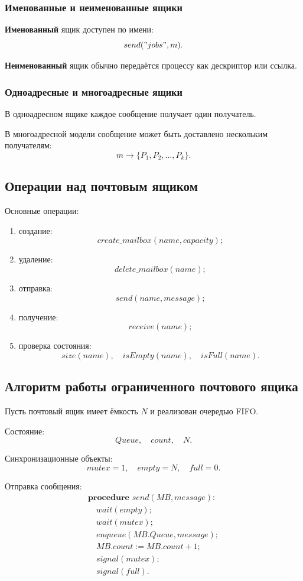 \documentclass[12pt,a4paper]{article}
\begin{document}
\subsubsection{Именованные и неименованные ящики}

\textbf{Именованный} ящик доступен по имени:
\[
send("jobs", m).
\]

\textbf{Неименованный} ящик обычно передаётся процессу как дескриптор или ссылка.

\subsubsection{Одноадресные и многоадресные ящики}

В одноадресном ящике каждое сообщение получает один получатель.

В многоадресной модели сообщение может быть доставлено нескольким получателям:
\[
m \rightarrow \{P_1, P_2, \ldots, P_k\}.
\]

\subsection{Операции над почтовым ящиком}

Основные операции:
\begin{enumerate}
    \item создание:
    \[
    create\_mailbox(name, capacity);
    \]
    \item удаление:
    \[
    delete\_mailbox(name);
    \]
    \item отправка:
    \[
    send(name, message);
    \]
    \item получение:
    \[
    receive(name);
    \]
    \item проверка состояния:
    \[
    size(name),\quad isEmpty(name),\quad isFull(name).
    \]
\end{enumerate}

\subsection{Алгоритм работы ограниченного почтового ящика}

Пусть почтовый ящик имеет ёмкость $N$ и реализован очередью FIFO.

Состояние:
\[
Queue,\quad count,\quad N.
\]

Синхронизационные объекты:
\[
mutex = 1,\quad empty = N,\quad full = 0.
\]

Отправка сообщения:
\[
\begin{array}{l}
\textbf{procedure } send(MB, message):\\
\quad wait(empty);\\
\quad wait(mutex);\\
\quad enqueue(MB.Queue, message);\\
\quad MB.count := MB.count + 1;\\
\quad signal(mutex);\\
\quad signal(full).
\end{array}
\]
\end{document}
